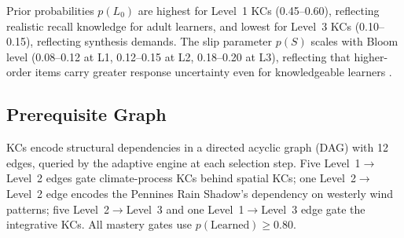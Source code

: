 Prior probabilities $p(L_0)$ are highest for Level~1 KCs (0.45--0.60),
reflecting realistic recall knowledge for adult learners, and lowest for
Level~3 KCs (0.10--0.15), reflecting synthesis demands. The slip parameter
$p(S)$ scales with Bloom level (0.08--0.12 at L1, 0.12--0.15 at L2,
0.18--0.20 at L3), reflecting that higher-order items carry greater response
uncertainty even for knowledgeable learners \parencite{pardos2011}.

\subsection{Prerequisite Graph}
\label{subsec:meth_prerequisite}

KCs encode structural dependencies in a directed acyclic graph (DAG) with
12 edges, queried by the adaptive engine at each selection step. Five
Level~1$\to$Level~2 edges gate climate-process KCs behind spatial KCs; one
Level~2$\to$Level~2 edge encodes the Pennines Rain Shadow's dependency on
westerly wind patterns; five Level~2$\to$Level~3 and one Level~1$\to$Level~3
edge gate the integrative KCs. All mastery gates use $p(\text{Learned}) \geq 0.80$.

